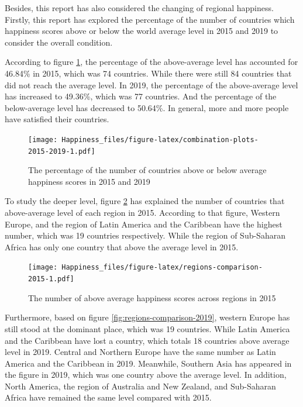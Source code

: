 \documentclass[11pt,a4paper,]{article}
\begin{document}
Besides, this report has also considered the changing of regional happiness. Firstly, this report has explored the percentage of the number of countries which happiness scores above or below the world average level in 2015 and 2019 to consider the overall condition.

According to figure \ref{fig:combination-plots-2015-2019}, the percentage of the above-average level has accounted for 46.84\% in 2015, which was 74 countries. While there were still 84 countries that did not reach the average level. In 2019, the percentage of the above-average level has increased to 49.36\%, which was 77 countries. And the percentage of the below-average level has decreased to 50.64\%. In general, more and more people have satisfied their countries.

\begin{figure}
\centering
\texttt{[image: Happiness\_files/figure-latex/combination-plots-2015-2019-1.pdf]}
\caption{\label{fig:combination-plots-2015-2019}The percentage of the number of countries above or below average happiness scores in 2015 and 2019}
\end{figure}

To study the deeper level, figure \ref{fig:regions-comparison-2015} has explained the number of countries that above-average level of each region in 2015. According to that figure, Western Europe, and the region of Latin America and the Caribbean have the highest number, which was 19 countries respectively. While the region of Sub-Saharan Africa has only one country that above the average level in 2015.

\begin{figure}
\centering
\texttt{[image: Happiness\_files/figure-latex/regions-comparison-2015-1.pdf]}
\caption{\label{fig:regions-comparison-2015}The number of above average happiness scores across regions in 2015}
\end{figure}

Furthermore, based on figure \ref{fig:regions-comparison-2019}, western Europe has still stood at the dominant place, which was 19 countries. While Latin America and the Caribbean have lost a country, which totals 18 countries above average level in 2019. Central and Northern Europe have the same number as Latin America and the Caribbean in 2019. Meanwhile, Southern Asia has appeared in the figure in 2019, which was one country above the average level. In addition, North America, the region of Australia and New Zealand, and Sub-Saharan Africa have remained the same level compared with 2015.
\end{document}
